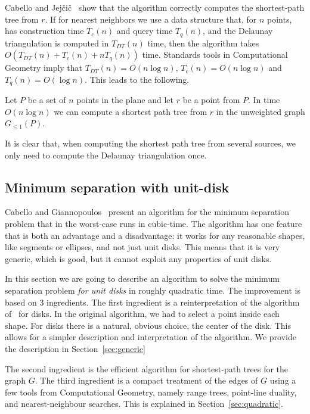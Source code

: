 \documentclass[a4paper,USenglish]{lipics}
\newcommand{\GG}{\ensuremath{G_{\le 1}}}
\let\le\leqslant
\begin{document}
Cabello and Jej\v{c}i\v{c}~\cite{CJ15} show that the algorithm correctly computes
the shortest-path tree from $r$. 
If for nearest neighbors we use a data structure that,
for $n$ points, has construction time $T_c(n)$ and query time $T_q(n)$, 
and the Delaunay triangulation is computed in $T_{DT}(n)$ time,
then the algorithm takes $O(T_{DT}(n)+ T_c(n)+ n T_q(n))$ time. 
Standards tools in Computational Geometry imply that 
$T_{DT}(n)=O(n\log n)$, $T_c(n)=O(n\log n)$ and $T_q(n)=O(\log n)$.
This leads to the following.

\begin{theorem}
  Let $P$ be a set of $n$ points in the plane and let $r$ be a point from $P$. 
  In time $O(n \log n)$ we can compute a shortest path tree from $r$
  in the unweighted graph $\GG(P)$.
\end{theorem}

It is clear that, when computing the shortest path tree from several sources,
we only need to compute the Delaunay triangulation once.

\subsection{Minimum separation with unit-disk}
\label{sec:algorithm-separation}

Cabello and Giannopoulos~\cite{CG16} present an algorithm
for the minimum separation problem that in the worst-case runs in cubic-time.
The algorithm has one feature that is both an advantage and a disadvantage: 
it works for any reasonable shapes, like segments or ellipses, and not just unit disks.
This means that it is very generic, which is good,
but it cannot exploit any properties of  unit disks.

In this section we are going to describe an algorithm to solve the minimum separation
problem \emph{for unit disks} in roughly quadratic time.
The improvement is based on 3 ingredients. 
The first ingredient is a reinterpretation of the algorithm of~\cite{CG16} 
for disks. In the original algorithm, we had to select a point inside each
shape. For disks there is a natural, obvious choice, the center of the disk.
This allows for a simpler description and interpretation of the algorithm.
We provide the description in Section~\ref{sec:generic}

The second ingredient is the efficient algorithm for shortest-path trees for the graph $G$.
The third ingredient is a compact treatment of the edges of $G$ using
a few tools from Computational Geometry, namely 
range trees, point-line duality, and nearest-neighbour searches.
This is explained in Section~\ref{sec:quadratic}.
\end{document}
